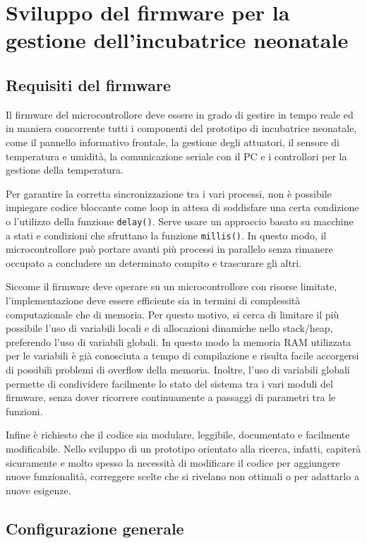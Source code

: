 \chapter{Sviluppo del firmware per la gestione dell'incubatrice neonatale}
\section{Requisiti del firmware}
Il firmware del microcontrollore deve essere in grado di gestire in tempo reale ed in maniera concorrente tutti i
componenti del prototipo di incubatrice neonatale, come il pannello informativo frontale, la gestione degli attuatori,
il sensore di temperatura e umidità, la comunicazione seriale con il PC e i controllori per la gestione della temperatura.

Per garantire la corretta sincronizzazione tra i vari processi, non è possibile impiegare codice bloccante come loop
in attesa di soddisfare una certa condizione o l'utilizzo della funzione \verb|delay()|. Serve usare un approccio basato
su macchine a stati e condizioni che sfruttano la funzione \verb|millis()|. In questo modo, il microcontrollore può
portare avanti più processi in parallelo senza rimanere occupato a concludere un determinato compito e trascurare gli altri.

Siccome il firmware deve operare su un microcontrollore con risorse limitate, l'implementazione deve essere efficiente
sia in termini di complessità computazionale che di memoria. Per questo motivo, si cerca di limitare il più possibile
l'uso di variabili locali e di allocazioni dinamiche nello stack/heap, preferendo l'uso di variabili globali. In questo
modo la memoria RAM utilizzata per le variabili è già conosciuta a tempo di compilazione e risulta facile accorgersi di
possibili problemi di overflow della memoria. Inoltre, l'uso di variabili globali permette di condividere facilmente
lo stato del sistema tra i vari moduli del firmware, senza dover ricorrere continuamente a passaggi di parametri tra
le funzioni.

Infine è richiesto che il codice sia modulare, leggibile, documentato e facilmente modificabile. Nello sviluppo di un
prototipo orientato alla ricerca, infatti, capiterà sicuramente e molto spesso la necessità di modificare il codice
per aggiungere nuove funzionalità, correggere scelte che si rivelano non ottimali o per adattarlo a nuove esigenze.

\section{Configurazione generale}

